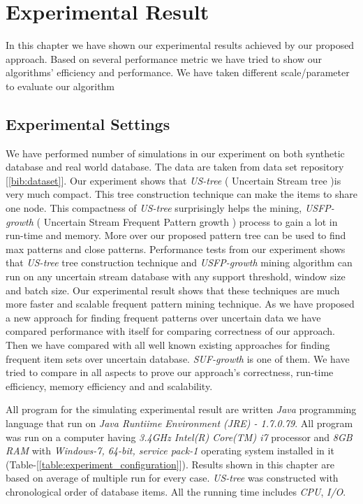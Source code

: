 %
\chapter{Experimental Result}
In this chapter we have shown our experimental results achieved by our proposed approach. Based on several performance metric we have tried to show our algorithms' efficiency and performance. We have taken different scale/parameter to evaluate our algorithm
\section{Experimental Settings}
We have performed number of simulations in our experiment on both synthetic database and real world database. The data are taken from data set repository [\ref{bib:dataset}]. Our experiment shows that \emph{US-tree} ( Uncertain Stream tree )is very much compact. This tree construction technique can make the items to share one node. This compactness of \emph{US-tree} surprisingly helps the mining, \emph{USFP-growth} ( Uncertain Stream Frequent Pattern growth ) process to gain a lot in run-time and memory. More over our proposed pattern tree can be used to find max patterns and close patterns. Performance tests from our experiment shows that \emph{US-tree} tree construction technique and \emph{USFP-growth} mining algorithm can run on any uncertain stream database with any support threshold, window size and batch size. Our experimental result shows that these techniques are much more faster and scalable frequent pattern mining technique. As we have proposed a new approach for finding frequent patterns over uncertain data we have compared performance with itself for comparing correctness of our approach. Then we have compared with all well known existing approaches for finding frequent item sets over uncertain database. \emph{SUF-growth} is one of them. We have tried to compare in all aspects to prove our approach's correctness, run-time efficiency, memory efficiency and and scalability.

All program for the simulating experimental result are written \emph{Java} programming language that run on \emph{Java Runtiime Environment (JRE) - 1.7.0.79}. All program was run on a computer having \emph{3.4GHz Intel(R) Core(TM) i7} processor and \emph{8GB RAM} with \emph{Windows-7, 64-bit, service pack-1} operating system installed in it (Table-[\ref{table:experiment_configuration}]). Results shown in this chapter are based on average of multiple run for every case. \emph{US-tree} was constructed with chronological order of database items. All the running time includes \emph{CPU}, \emph{I/O}.\\
